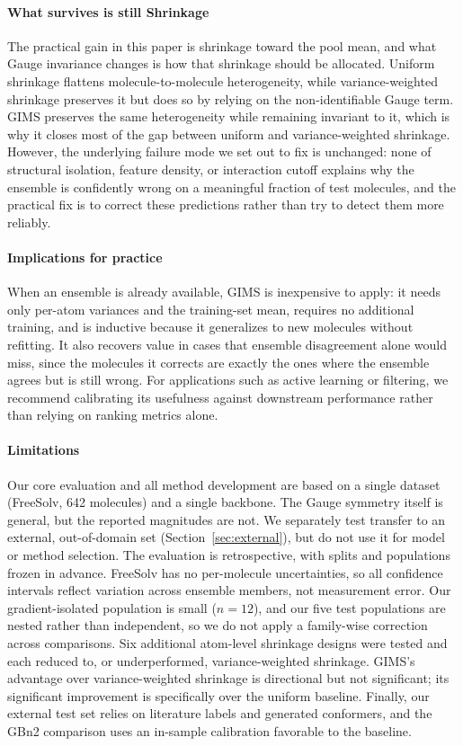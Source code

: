 \documentclass{article}
\begin{document}
\paragraph{What survives is still Shrinkage} The practical gain in this
paper is shrinkage toward the pool mean, and what Gauge invariance changes is
how that shrinkage should be allocated. Uniform shrinkage flattens
molecule-to-molecule heterogeneity, while variance-weighted shrinkage
preserves it but does so by relying on the non-identifiable Gauge term. GIMS
preserves the same heterogeneity while remaining invariant to it, which is
why it closes most of the gap between uniform and variance-weighted
shrinkage. However, the underlying failure mode we set out to fix is
unchanged: none of structural isolation, feature density, or interaction
cutoff explains why the ensemble is confidently wrong on a meaningful
fraction of test molecules, and the practical fix is to correct these predictions rather than try to detect them more reliably.

\paragraph{Implications for practice} When an ensemble is already available,
GIMS is inexpensive to apply: it needs only per-atom variances and the
training-set mean, requires no additional training, and is inductive because it generalizes to new molecules without refitting. It also recovers
value in cases that ensemble disagreement alone would miss, since the
molecules it corrects are exactly the ones where the ensemble agrees but is
still wrong. For applications such as active learning or filtering, we
recommend calibrating its usefulness against downstream performance rather
than relying on ranking metrics alone.

\paragraph{Limitations} Our core evaluation and all method development are
based on a single dataset (FreeSolv, 642 molecules) and a single backbone.
The Gauge symmetry itself is general, but the reported magnitudes are not.
We separately test transfer to an external, out-of-domain set
(Section~\ref{sec:external}), but do not use it for model or method
selection. The evaluation is retrospective, with splits and populations
frozen in advance. FreeSolv has no per-molecule uncertainties, so all
confidence intervals reflect variation across ensemble members, not
measurement error. Our gradient-isolated population is small ($n=12$), and
our five test populations are nested rather than independent, so we do not
apply a family-wise correction across comparisons. Six additional atom-level
shrinkage designs were tested and each reduced to, or underperformed,
variance-weighted shrinkage. GIMS's advantage over variance-weighted
shrinkage is directional but not significant; its significant improvement is
specifically over the uniform baseline. Finally, our external test set
relies on literature labels and generated conformers, and the GBn2
comparison uses an in-sample calibration favorable to the baseline.
\end{document}
